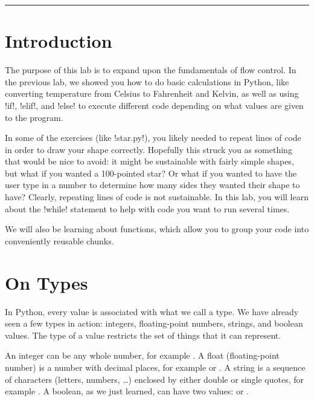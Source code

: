 \documentclass[11pt]{cselabheader}
\begin{document}
\hrule

\section{Introduction}

The purpose of this lab is to expand upon the fundamentals of flow control.
In the previous lab, we showed you how to do basic calculations in Python,
like converting temperature from Celsius to Fahrenheit and Kelvin, as well
as using \pythoninline!if!, \pythoninline!elif!, and \pythoninline!else! to
execute different code depending on what values are given to the program.

In some of the exercises (like \pythoninline!star.py!), you likely needed to
repeat lines of code in order to draw your shape correctly. Hopefully this struck
you as something that would be nice to avoid: it might be sustainable with fairly
simple shapes, but what if you wanted a 100-pointed star? Or what if you wanted to
have the user type in a number to determine how many sides they wanted their shape
to have? Clearly, repeating lines of code is not sustainable. In this lab, you will
learn about the \pythoninline!while! statement to help with code you want to run
several times.

We will also be learning about functions, which allow you to group your code
into conveniently reusable chunks.

\pagebreak

\tableofcontents

\pagebreak

\section{On Types}

In Python, every value is associated with what we call a type. We have already
seen a few types in action: integers, floating-point numbers, strings, and
boolean values. The type of a value restricts the set of things that it can
represent.

An integer can be any whole number, for example . A
float (floating-point number) is a number with decimal places, for example
 or . A string is a sequence of characters
(letters, numbers, \ldots) enclosed by either double or single quotes, for
example . A boolean, as we just learned, can have
two values:  or .
\end{document}
